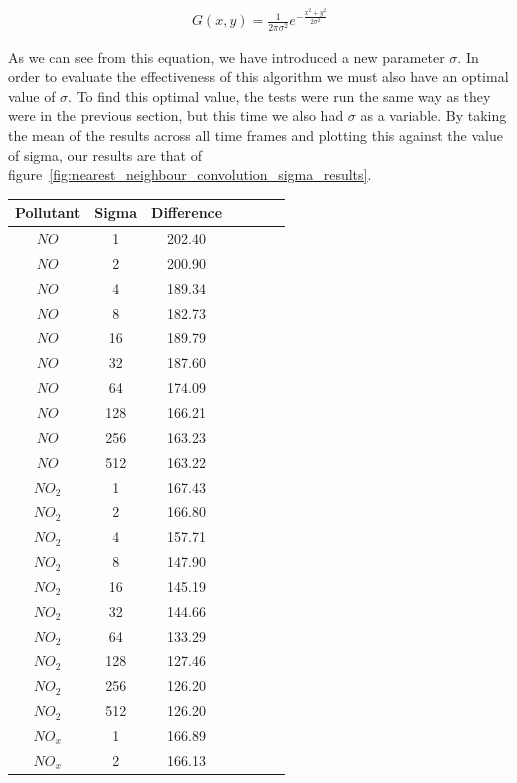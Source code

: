 			\begin{align*}
				G(x,y) = \frac{1}{2\pi\sigma^{2}} e^{-\frac{x^{2} + y^{2}}{2\sigma^{2}}}
			\end{align*}

			As we can see from this equation, we have introduced a new parameter $\sigma$. In order to evaluate the effectiveness of this algorithm we must also have an optimal value of $\sigma$. To find this optimal value, the tests were run the same way as they were in the previous section, but this time we also had $\sigma$ as a variable. By taking the mean of the results across all time frames and plotting this against the value of sigma, our results are that of figure~\ref{fig:nearest_neighbour_convolution_sigma_results}. 

			\iffalse
				\begin{table}[H]
					\centering
		    		\begin{tabular}{|c|c|c|c|c|c|c|}
		    			\hline
						Pollutant & Sigma & Difference \\ \hline
						$NO$ & 1 & 202.40 \\
						$NO$ & 2 & 200.90 \\
						$NO$ & 4 & 189.34 \\
						$NO$ & 8 & 182.73 \\
						$NO$ & 16 & 189.79 \\
						$NO$ & 32 & 187.60 \\
						$NO$ & 64 & 174.09 \\
						$NO$ & 128 & 166.21 \\
						$NO$ & 256 & 163.23 \\
						$NO$ & 512 & 163.22 \\
						$NO_{2}$ & 1 & 167.43 \\
						$NO_{2}$ & 2 & 166.80 \\
						$NO_{2}$ & 4 & 157.71 \\
						$NO_{2}$ & 8 & 147.90 \\
						$NO_{2}$ & 16 & 145.19 \\
						$NO_{2}$ & 32 & 144.66 \\
						$NO_{2}$ & 64 & 133.29 \\
						$NO_{2}$ & 128 & 127.46 \\
						$NO_{2}$ & 256 & 126.20 \\
						$NO_{2}$ & 512 & 126.20 \\
						$NO_{x}$ & 1 & 166.89 \\
						$NO_{x}$ & 2 & 166.13 \\

\end{tabular}
\end{table}
